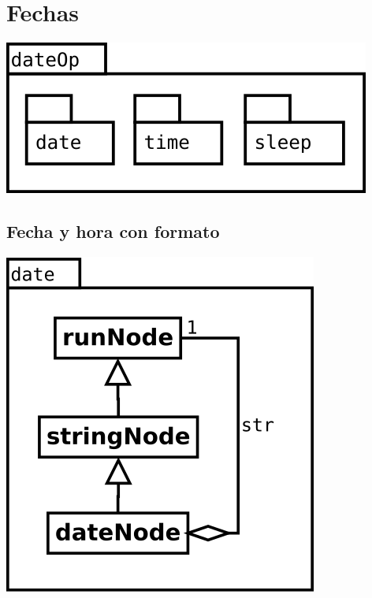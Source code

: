 \pagebreak
\section {Fechas} 
\begin{center}
\includegraphics[scale=0.4]{dateOp-package.png} \\
\end{center}

\subsection {Fecha y hora con formato} 
\begin{center}
\includegraphics[scale=0.4]{date.png} \\
\end{center}

